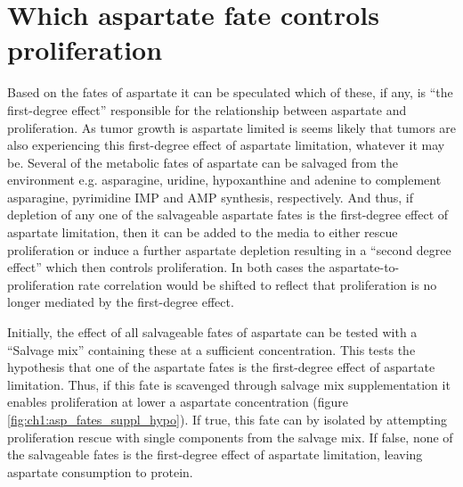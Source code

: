 \section{Which aspartate fate controls proliferation}
Based on the fates of aspartate it can be speculated which of these, if any, is ``the first-degree effect'' responsible for the relationship between aspartate and proliferation.
As tumor growth is aspartate limited is seems likely that tumors are also experiencing this first-degree effect of aspartate limitation, whatever it may be.
Several of the metabolic fates of aspartate can be salvaged from the environment e.g. asparagine, uridine, hypoxanthine and adenine to complement asparagine, pyrimidine IMP and AMP synthesis, respectively.
And thus, if depletion of any one of the salvageable aspartate fates is the first-degree effect of aspartate limitation, then it can be added to the media to either rescue proliferation or induce a further aspartate depletion resulting in a ``second degree effect'' which then controls proliferation.
In both cases the aspartate-to-proliferation rate correlation would be shifted to reflect that proliferation is no longer mediated by the first-degree effect.

Initially, the effect of all salvageable fates of aspartate can be tested with a ``Salvage mix'' containing these at a sufficient concentration.
This tests the hypothesis that one of the aspartate fates is the first-degree effect of aspartate limitation.
Thus, if this fate is scavenged through salvage mix supplementation it enables proliferation at lower a aspartate concentration (figure \ref{fig:ch1:asp_fates_suppl_hypo}).
If true, this fate can by isolated by attempting proliferation rescue with single components from the salvage mix.
If false, none of the salvageable fates is the first-degree effect of aspartate limitation, leaving aspartate consumption to protein.

